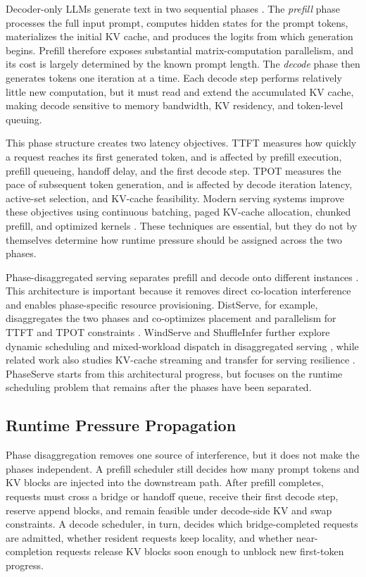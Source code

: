 \documentclass[lettersize,journal]{IEEEtran}
\begin{document}
Decoder-only LLMs generate text in two sequential phases \cite{transformer,b1,b2,b3}. The \emph{prefill} phase processes the full input prompt, computes hidden states for the prompt tokens, materializes the initial KV cache, and produces the logits from which generation begins. Prefill therefore exposes substantial matrix-computation parallelism, and its cost is largely determined by the known prompt length. The \emph{decode} phase then generates tokens one iteration at a time. Each decode step performs relatively little new computation, but it must read and extend the accumulated KV cache, making decode sensitive to memory bandwidth, KV residency, and token-level queuing.

This phase structure creates two latency objectives. TTFT measures how quickly a request reaches its first generated token, and is affected by prefill execution, prefill queueing, handoff delay, and the first decode step. TPOT measures the pace of subsequent token generation, and is affected by decode iteration latency, active-set selection, and KV-cache feasibility. Modern serving systems improve these objectives using continuous batching, paged KV-cache allocation, chunked prefill, and optimized kernels \cite{orca,vllm,tensorrt,sarathi,flashattention,flashattention2}. These techniques are essential, but they do not by themselves determine how runtime pressure should be assigned across the two phases.

Phase-disaggregated serving separates prefill and decode onto different instances \cite{b5,distserve,windserve,shuffleinfer}. This architecture is important because it removes direct co-location interference and enables phase-specific resource provisioning. DistServe, for example, disaggregates the two phases and co-optimizes placement and parallelism for TTFT and TPOT constraints \cite{distserve}. WindServe and ShuffleInfer further explore dynamic scheduling and mixed-workload dispatch in disaggregated serving \cite{windserve,shuffleinfer}, while related work also studies KV-cache streaming and transfer for serving resilience \cite{b6}. PhaseServe starts from this architectural progress, but focuses on the runtime scheduling problem that remains after the phases have been separated.

\subsection{Runtime Pressure Propagation}

Phase disaggregation removes one source of interference, but it does not make the phases independent. A prefill scheduler still decides how many prompt tokens and KV blocks are injected into the downstream path. After prefill completes, requests must cross a bridge or handoff queue, receive their first decode step, reserve append blocks, and remain feasible under decode-side KV and swap constraints. A decode scheduler, in turn, decides which bridge-completed requests are admitted, whether resident requests keep locality, and whether near-completion requests release KV blocks soon enough to unblock new first-token progress.
\end{document}
